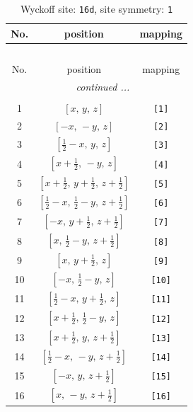 \documentclass[fleqn,8pt]{jsarticle}
\begin{document}
\begin{longtable}{ccc}
\caption{Wyckoff site: {\tt 16d}, site symmetry: {\tt 1}}
 \\
 \hline \hline
No. & position & mapping \\ \hline \endfirsthead

\multicolumn{2}{l}{\tablename\ \thetable{}} \\
 \hline \hline
No. & position & mapping \\ \hline \endhead

 \hline \hline
\multicolumn{2}{r}{\footnotesize\it continued ...} \\ \endfoot

 \hline \hline
\multicolumn{2}{r}{} \\ \endlastfoot

1 & $\left[ x,\, y,\, z \right]$ & {\tt [1]} \\ \hline
2 & $\left[ - x,\, - y,\, z \right]$ & {\tt [2]} \\ \hline
3 & $\left[ \frac{1}{2} - x,\, y,\, z \right]$ & {\tt [3]} \\ \hline
4 & $\left[ x + \frac{1}{2},\, - y,\, z \right]$ & {\tt [4]} \\ \hline
5 & $\left[ x + \frac{1}{2},\, y + \frac{1}{2},\, z + \frac{1}{2} \right]$ & {\tt [5]} \\ \hline
6 & $\left[ \frac{1}{2} - x,\, \frac{1}{2} - y,\, z + \frac{1}{2} \right]$ & {\tt [6]} \\ \hline
7 & $\left[ - x,\, y + \frac{1}{2},\, z + \frac{1}{2} \right]$ & {\tt [7]} \\ \hline
8 & $\left[ x,\, \frac{1}{2} - y,\, z + \frac{1}{2} \right]$ & {\tt [8]} \\ \hline
9 & $\left[ x,\, y + \frac{1}{2},\, z \right]$ & {\tt [9]} \\ \hline
10 & $\left[ - x,\, \frac{1}{2} - y,\, z \right]$ & {\tt [10]} \\ \hline
11 & $\left[ \frac{1}{2} - x,\, y + \frac{1}{2},\, z \right]$ & {\tt [11]} \\ \hline
12 & $\left[ x + \frac{1}{2},\, \frac{1}{2} - y,\, z \right]$ & {\tt [12]} \\ \hline
13 & $\left[ x + \frac{1}{2},\, y,\, z + \frac{1}{2} \right]$ & {\tt [13]} \\ \hline
14 & $\left[ \frac{1}{2} - x,\, - y,\, z + \frac{1}{2} \right]$ & {\tt [14]} \\ \hline
15 & $\left[ - x,\, y,\, z + \frac{1}{2} \right]$ & {\tt [15]} \\ \hline
16 & $\left[ x,\, - y,\, z + \frac{1}{2} \right]$ & {\tt [16]} \\
\end{longtable}
\end{document}
